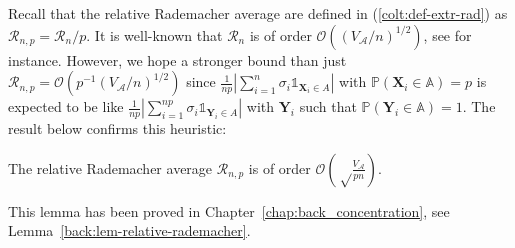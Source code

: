 Recall that the relative Rademacher average are defined in (\ref{colt:def-extr-rad}) as $\mathcal{R}_{n,p} = \mathcal{R}_n /p$. 
It is well-known that $\mathcal{R}_n$ is of order $\mathcal{O}( (V_{\mathcal{A}}/n)^{1/2})$, see \cite{Kolt06} for instance. However, we hope a stronger bound than just $\mathcal{R}_{n,p} = \mathcal{O}(p^{-1}(V_{\mathcal{A}}/n)^{1/2})$ since $\frac{1}{np} \left | \sum_{i=1}^{n} \sigma_i \mathds{1}_{\mathbf{X}_i \in A}\right|$ with $\mathbb{P}(\mathbf{X}_i \in \mathbb{A})=p$ is expected to be like $\frac{1}{np} \left | \sum_{i=1}^{np} \sigma_i \mathds{1}_{\mathbf{Y}_i \in A}\right|$ with $\mathbf{Y}_i$ such that $\mathbb{P}(\mathbf{Y}_i \in \mathbb{A}) = 1$. The result below confirms this heuristic:

\begin{lemma}
\label{colt:lem-relative-rademacher}
The relative Rademacher average ${\mathcal{R}}_{n,p}$ is of order $\mathcal{O}(\sqrt\frac{V_{\mathcal{A}}}{pn})$. %
\end{lemma}
This lemma has been proved in Chapter~\ref{chap:back_concentration}, see Lemma~\ref{back:lem-relative-rademacher}.



